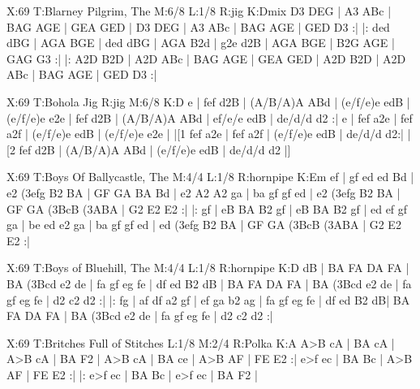 \documentclass[letterpaper]{article}
\begin{document}
\begin{abc}[name]
X:69
T:Blarney Pilgrim, The
M:6/8
L:1/8
R:jig
K:Dmix
D3 DEG | A3 ABc | BAG AGE | GEA GED |
D3 DEG | A3 ABc | BAG AGE | GED D3 :|
|: ded dBG | AGA BGE | ded dBG | AGA B2d |
g2e d2B | AGA BGE | B2G AGE | GAG G3 :|
|: A2D B2D | A2D ABc | BAG AGE | GEA GED |
A2D B2D | A2D ABc | BAG AGE | GED D3 :|
\end{abc}

\begin{abc}[name]
X:69
T:Bohola Jig
R:jig
M:6/8
K:D
e | fef d2B | (A/B/A)A ABd | (e/f/e)e edB | (e/f/e)e e2e |
fef d2B | (A/B/A)A ABd | ef/e/e edB | de/d/d d2 :|
e | fef a2e | fef a2f | (e/f/e)e edB | (e/f/e)e e2e |
|[1 fef a2e | fef a2f | (e/f/e)e edB | de/d/d d2:|
|[2 fef d2B | (A/B/A)A ABd | (e/f/e)e edB | de/d/d d2 |]
\end{abc}

\begin{abc}[name]
X:69
T:Boys Of Ballycastle, The
M:4/4
L:1/8
R:hornpipe
K:Em
ef | gf ed ed Bd | e2 (3efg B2 BA | GF GA BA Bd | e2 A2 A2 ga |
ba gf gf ed | e2 (3efg B2 BA | GF GA (3BcB (3ABA | G2 E2 E2 :|
|: gf | eB BA B2 gf | eB BA B2 gf | ed ef gf ga | be ed e2 ga  |
ba gf gf ed | ed (3efg B2 BA | GF GA (3BcB (3ABA | G2 E2 E2 :|
\end{abc}

\begin{abc}[name]
X:69
T:Boys of Bluehill, The
M:4/4
L:1/8
R:hornpipe
K:D
dB | BA FA DA FA | BA (3Bcd e2 de | fa gf eg fe | df ed B2 dB |
BA FA DA FA | BA (3Bcd e2 de | fa gf eg fe | d2 c2 d2 :|
|: fg | af df a2 gf | ef ga b2 ag | fa gf eg fe | df ed B2 dB|
BA FA DA FA | BA (3Bcd e2 de | fa gf eg fe | d2 c2 d2 :|
\end{abc}

\begin{abc}[name]
X:69
T:Britches Full of Stitches
L:1/8
M:2/4
R:Polka
K:A
A>B cA | BA cA | A>B cA | BA F2 |
A>B cA | BA ce | A>B AF | FE E2 :|
e>f ec | BA Bc | A>B AF | FE E2 :|
|: e>f ec | BA Bc | e>f ec | BA F2 |
\end{abc}
\end{document}
